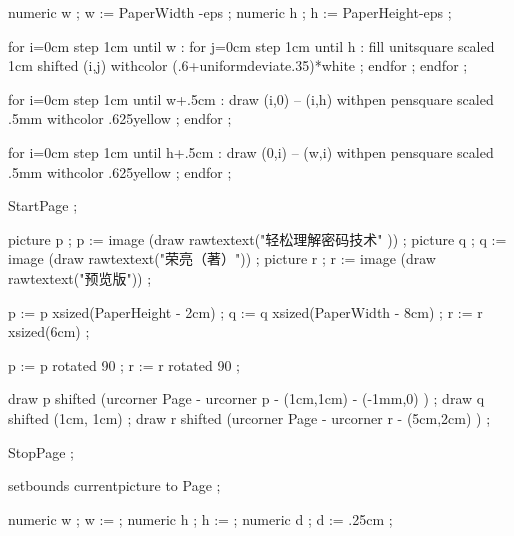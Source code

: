 
    numeric w ; w := PaperWidth -eps ; %
    numeric h ; h := PaperHeight-eps ; %

    for i=0cm step 1cm until w  :
        for j=0cm step 1cm until h :
            fill unitsquare scaled 1cm shifted (i,j) withcolor (.6+uniformdeviate.35)*white ;
        endfor ;
    endfor ;


    for i=0cm step 1cm until w+.5cm :
        draw (i,0) -- (i,h) withpen pensquare scaled .5mm withcolor .625yellow ;
    endfor ;

    for i=0cm step 1cm until h+.5cm :
        draw (0,i) -- (w,i) withpen pensquare scaled .5mm withcolor .625yellow ;
    endfor ;

\stopuseMPgraphic


    StartPage ;


        picture p ; p := image (draw rawtextext("\darkred 轻松理解密码技术"   )) ;
        picture q ; q := image (draw rawtextext("\darkred{}荣亮（著）")) ;
        picture r ; r := image (draw rawtextext("\darkred{}预览版")) ;

        p := p xsized(PaperHeight - 2cm) ;
        q := q xsized(PaperWidth  - 8cm) ;
        r := r xsized(6cm) ;

        p := p rotated 90 ;
        r := r rotated 90 ;

        draw p shifted (urcorner Page - urcorner p - (1cm,1cm) - (-1mm,0) ) ;
        draw q shifted (1cm, 1cm) ;
        draw r shifted (urcorner Page - urcorner r - (5cm,2cm) ) ;

    StopPage ;

    setbounds currentpicture to Page ;

\stopuseMPgraphic



\stopuseMPgraphic


    numeric w ; w := \overlaywidth ;
    numeric h ; h := \overlayheight ;
    numeric d ; d := .25cm ;

